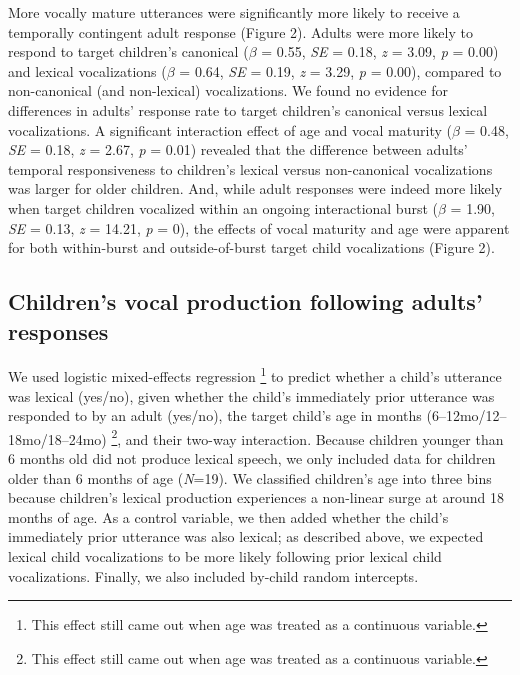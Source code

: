 \documentclass[
  man]{apa6}
\begin{document}
More vocally mature utterances were significantly more likely to receive a temporally contingent adult response (Figure 2). Adults were more likely to respond to target children's canonical (\(\beta\) = 0.55, \emph{SE} = 0.18, \emph{z} = 3.09, \emph{p} = 0.00) and lexical vocalizations (\(\beta\) = 0.64, \emph{SE} = 0.19, \emph{z} = 3.29, \emph{p} = 0.00), compared to non-canonical (and non-lexical) vocalizations. We found no evidence for differences in adults' response rate to target children's canonical versus lexical vocalizations. A significant interaction effect of age and vocal maturity (\(\beta\) = 0.48, \emph{SE} = 0.18, \emph{z} = 2.67, \emph{p} = 0.01) revealed that the difference between adults' temporal responsiveness to children's lexical versus non-canonical vocalizations was larger for older children. And, while adult responses were indeed more likely when target children vocalized within an ongoing interactional burst (\(\beta\) = 1.90, \emph{SE} = 0.13, \emph{z} = 14.21, \emph{p} = 0), the effects of vocal maturity and age were apparent for both within-burst and outside-of-burst target child vocalizations (Figure 2).

\hypertarget{childrens-vocal-production-following-adults-responses}{%
\subsection{Children's vocal production following adults' responses}\label{childrens-vocal-production-following-adults-responses}}

We used logistic mixed-effects regression \footnote{This effect still came out when age was treated as a continuous variable.} to predict whether a child's utterance was lexical (yes/no), given whether the child's immediately prior utterance was responded to by an adult (yes/no), the target child's age in months (6--12mo/12--18mo/18--24mo) \footnote{This effect still came out when age was treated as a continuous variable.}, and their two-way interaction. Because children younger than 6 months old did not produce lexical speech, we only included data for children older than 6 months of age (\emph{N}=19). We classified children's age into three bins because children's lexical production experiences a non-linear surge at around 18 months of age. As a control variable, we then added whether the child's immediately prior utterance was also lexical; as described above, we expected lexical child vocalizations to be more likely following prior lexical child vocalizations. Finally, we also included by-child random intercepts.
\end{document}
